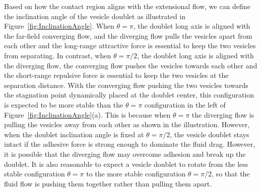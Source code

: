 \documentclass[prf,superscriptaddress,showkeys]{revtex4-1}
\begin{document}
Based on how the contact region aligns with the extensional flow, we can
define the inclination angle of the vesicle doublet as illustrated in
Figure~\ref{fig:InclinationAngle}. When $\theta=\pi$, the doublet long
axis is aligned with the far-field converging flow, and the diverging flow
pulls the vesicles apart from each other and the long-range attractive
force is essential to keep the two vesicles from separating.  In
contrast, when $\theta = \pi/2$, the doublet long axis is aligned with
the diverging flow, the converging flow pushes the vesicles towards
each other and the short-range repulsive force is essential to keep the
two vesicles at the separation distance.  With the converging flow
pushing the two vesicles towards the stagnation point dynamically placed
at the doublet center, this configuration is expected to be more stable
than the $\theta=\pi$ configuration in the left of
Figure~\ref{fig:InclinationAngle}(a). This is because when $\theta=\pi$
the diverging flow is pulling the vesicles away from each other as shown
in the illustration.  However, when the doublet inclination angle is
fixed at $\theta=\pi/2$, the vesicle doublet stays intact if the
adhesive force is strong enough to dominate the fluid drag.  However, it
is possible that the diverging flow may overcome adhesion and break up
the doublet.  It is also reasonable to expect a vesicle doublet to
rotate from the less stable configuration $\theta=\pi$ to the more
stable configuration $\theta=\pi/2$, so that the fluid flow is pushing
them together rather than pulling them apart.
\end{document}
